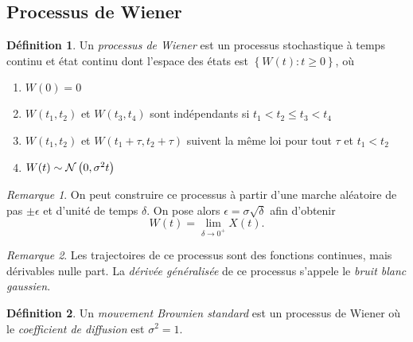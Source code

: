 \documentclass[11pt]{article}
\makeatletter
\newcommand\Norm[2]{%
	\ensuremath{%
		\mathcal{N}\left(#1,#2\right)%
	}%
}%
\theoremstyle{remark}
\newtheorem*{remark}{Remarque}
\theoremstyle{definition}
\newtheorem*{@definition}{Définition}
\newenvironment{definition}{%
	\begin{@definition}%
}{%
	\end{@definition}%
	\setcounter{property}{0}%
}
\makeatother
\begin{document}
\subsection{Processus de Wiener}
\begin{definition}
	Un \textit{processus de Wiener} est un processus stochastique à temps
	continu et état continu dont l'espace des états est $\left\{W(t):t\geq 0
	\right\}$, où
	\begin{enumerate}
		\item $W(0)=0$
		\item $W(t_1,t_2)$ et $W(t_3,t_4)$ sont indépendants si $t_1<t_2\leq
		      t_3<t_4$
		\item $W(t_1,t_2)$ et $W(t_1+\tau,t_2+\tau)$ suivent la même loi pour
		      tout $\tau$ et $t_1<t_2$
		\item $W(t)\sim\Norm{0}{\sigma^2 t}$
	\end{enumerate}
\end{definition}

\begin{remark}
	On peut construire ce processus à partir d'une marche aléatoire de pas
	$\pm\epsilon$ et d'unité de temps $\delta$. On pose alors $\epsilon=\sigma
	\sqrt{\delta}$ afin d'obtenir
	\begin{equation*}
		W(t)=\lim_{\delta\rightarrow 0^+}X(t).
	\end{equation*}
\end{remark}

\begin{remark}
	Les trajectoires de ce processus sont des fonctions continues, mais
	dérivables nulle part. La \textit{dérivée généralisée} de ce processus 
	s'appele le \textit{bruit blanc gaussien}.
\end{remark}

\begin{definition}
	Un \textit{mouvement Brownien standard} est un processus de Wiener où le
	\textit{coefficient de diffusion} est $\sigma^2=1$.
\end{definition}
\end{document}
